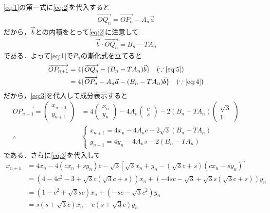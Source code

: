 \documentclass[../../main.tex]{subfiles}
\begin{document}
\cref{eq:1}の第一式に\cref{eq:2}を代入すると
\begin{align}
  \overrightarrow{OQ_n}=\overrightarrow{OP_n}-A_n\vec{a} \label{eq:4}
\end{align}
だから，$\vec{b}$との内積をとって\cref{eq:2}に注意して
\begin{align}
  \vec{b}\cdot\overrightarrow{OQ_n}=B_n - TA_n \label{eq:5}
\end{align}
である．よって\cref{eq:1}で$P_n$の漸化式を立てると
\begin{align}
  \overrightarrow{OP_{n+1}}
  &= 4\{ \overrightarrow{OQ_n}-(B_n - TA_n)\vec{b} \} \quad (\because\text{\cref{eq:5}})\\
  &= 4\{ \overrightarrow{OP_n}-A_n\vec{a} - (B_n - TA_n)\vec{b}\} \quad (\because\text{\cref{eq:4}})
\end{align}
だから，\cref{eq:3}を代入して成分表示すると
\begin{align}
  \overrightarrow{OP_{n+1}} =
  \begin{pmatrix}
    x_{n+1} \\ y_{n+1}
  \end{pmatrix}
  &= 4
  \begin{pmatrix}
    x_{n} \\ y_{n}
  \end{pmatrix}
  -4A_n
  \begin{pmatrix}
    c \\ s
  \end{pmatrix}
  -2(B_n-TA_n)
  \begin{pmatrix}
    \sqrt{3} \\ 1
  \end{pmatrix} \\
  \therefore
  &
  \begin{cases}
    x_{n+1} = 4x_{n} - 4A_nc - 2\sqrt{3}(B_n-TA_n) \\
    y_{n+1} = 4y_{n} - 4A_ns - 2(B_n-TA_n)
  \end{cases}
\end{align}
である．さらに\cref{eq:3}を代入して
\begin{align}
  x_{n+1}
  &= 4x_{n} - 4(cx_n+sy_n)c - \sqrt{3}\left[\sqrt{3}x_n+y_n-(\sqrt{3}c+s)(cx_n+sy_n)\right] \\
  &= (4 - 4c^2 - 3 + \sqrt{3}c(\sqrt{3}c+s)) x_n
  + (-4sc - \sqrt{3} + \sqrt{3}s(\sqrt{3}c+s)) y_n \\
  &= (1 - c^2 + \sqrt{3}sc) x_n + (-sc - \sqrt{3}c^2) y_n \\
  &= s(s + \sqrt{3}c) x_n - c(s + \sqrt{3}c) y_n \label{eq:6}
\end{align}
\end{document}

